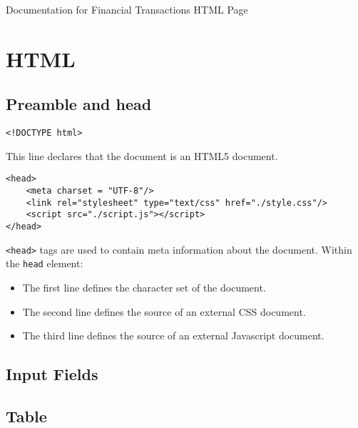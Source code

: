 \documentclass[letterpaper]{article}
\begin{document}
\vspace*{\fill}
\begin{center}
    \Large
    Documentation for Financial Transactions HTML Page
\end{center}
\vspace*{\fill}

\newpage
{}
\tableofcontents

\newpage
{}

\section{HTML}

\subsection{Preamble and head}

\begin{lstlisting}[firstnumber=1]
<!DOCTYPE html>
\end{lstlisting}

This line declares that the document is an HTML5 document.

\begin{lstlisting}[firstnumber=2]
<head>
    <meta charset = "UTF-8"/>
    <link rel="stylesheet" type="text/css" href="./style.css"/>
    <script src="./script.js"></script>
</head>
\end{lstlisting}

\lstinline{<head>} tags are used to contain meta information about the document.
Within the \lstinline{head} element:

\begin{itemize}
    \item The first line defines the character set of the document.
    \item The second line defines the source of an external CSS document.
    \item The third line defines the source of an external Javascript document.
\end{itemize}

\subsection{Input Fields}

\subsection{Table}
\end{document}
